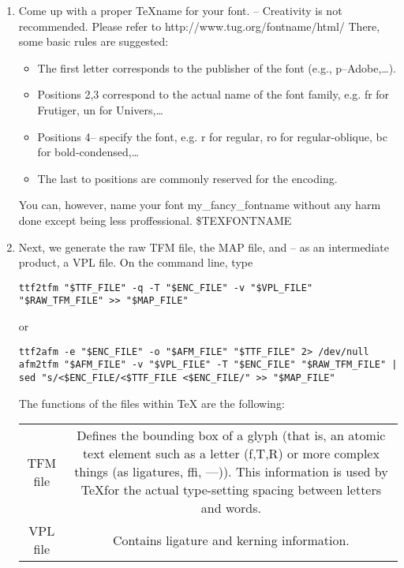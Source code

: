 \documentclass[10pt]{scrartcl}
\begin{document}
\begin{enumerate}
\item Come up with a proper \TeX name for your font. -- Creativity is not recommended. Please refer to http://www.tug.org/fontname/html/ There, some basic rules are suggested:
\begin{itemize}
\item The first letter corresponds to the publisher of the font (e.g., p--Adobe,\dots).
\item Positions 2,3 correspond to the actual name of the font family, e.g. fr for Frutiger, un for Univers,\dots
\item Positions 4-- specify the font, e.g. r for regular, ro for regular-oblique, bc for bold-condensed,\dots
\item The last to positions are commonly reserved for the encoding.
\end{itemize}
You can, however, name your font my\_fancy\_fontname without any harm done except being less proffessional. \mbox{\$TEXFONTNAME}

\item Next, we generate the raw TFM file, the MAP file, and -- as an intermediate product, a VPL file. On the command line, type
\begin{Verbatim}
ttf2tfm "$TTF_FILE" -q -T "$ENC_FILE" -v "$VPL_FILE" "$RAW_TFM_FILE" >> "$MAP_FILE"
\end{Verbatim}
or 
\begin{Verbatim}
ttf2afm -e "$ENC_FILE" -o "$AFM_FILE" "$TTF_FILE" 2> /dev/null
afm2tfm "$AFM_FILE" -v "$VPL_FILE" -T "$ENC_FILE" "$RAW_TFM_FILE" | sed "s/<$ENC_FILE/<$TTF_FILE <$ENC_FILE/" >> "$MAP_FILE"
\end{Verbatim}
The functions of the files within TeX are the following:

\begin{tabular*}{0.8\textwidth}{cc}
TFM file & Defines the bounding box of a glyph (that is, an atomic text element such as a letter (f,T,R) or more complex things (as ligatures, ffi, ---)). This information is used by \TeX for the actual type-setting spacing between letters and words.\\
VPL file & Contains ligature and kerning information.


\end{tabular*}
\end{enumerate}
\end{document}

